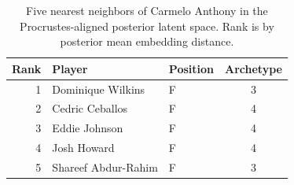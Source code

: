 \begin{table}[htbp]
  \centering\small
  \begin{tabular}{rllc}
    \toprule
    Rank & Player & Position & Archetype \\
    \midrule
    1 & Dominique Wilkins & F & 3 \\
    2 & Cedric Ceballos & F & 4 \\
    3 & Eddie Johnson & F & 4 \\
    4 & Josh Howard & F & 4 \\
    5 & Shareef Abdur-Rahim & F & 3 \\
    \bottomrule
  \end{tabular}
  \caption{Five nearest neighbors of Carmelo Anthony in the Procrustes-aligned posterior latent space. Rank is by posterior mean embedding distance.}
  \label{tab:Carmelo_Anthony_neighbors}
\end{table}

